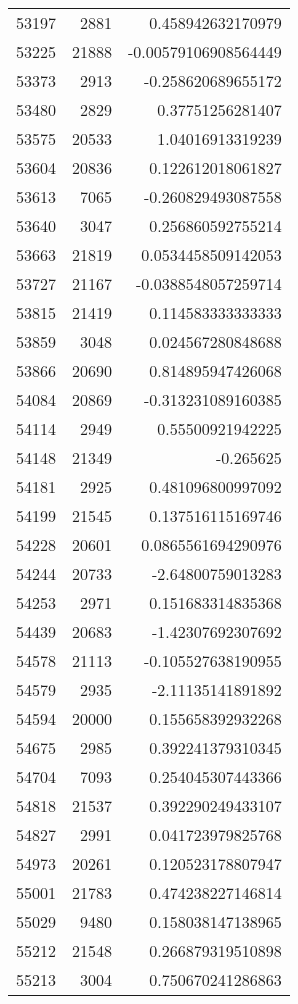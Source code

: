 \begin{tabular}{r | r | r}
53197 & 2881 & 0.458942632170979 \\
53225 & 21888 & -0.00579106908564449 \\
53373 & 2913 & -0.258620689655172 \\
53480 & 2829 & 0.37751256281407 \\
53575 & 20533 & 1.04016913319239 \\
53604 & 20836 & 0.122612018061827 \\
53613 & 7065 & -0.260829493087558 \\
53640 & 3047 & 0.256860592755214 \\
53663 & 21819 & 0.0534458509142053 \\
53727 & 21167 & -0.0388548057259714 \\
53815 & 21419 & 0.114583333333333 \\
53859 & 3048 & 0.024567280848688 \\
53866 & 20690 & 0.814895947426068 \\
54084 & 20869 & -0.313231089160385 \\
54114 & 2949 & 0.55500921942225 \\
54148 & 21349 & -0.265625 \\
54181 & 2925 & 0.481096800997092 \\
54199 & 21545 & 0.137516115169746 \\
54228 & 20601 & 0.0865561694290976 \\
54244 & 20733 & -2.64800759013283 \\
54253 & 2971 & 0.151683314835368 \\
54439 & 20683 & -1.42307692307692 \\
54578 & 21113 & -0.105527638190955 \\
54579 & 2935 & -2.11135141891892 \\
54594 & 20000 & 0.155658392932268 \\
54675 & 2985 & 0.392241379310345 \\
54704 & 7093 & 0.254045307443366 \\
54818 & 21537 & 0.392290249433107 \\
54827 & 2991 & 0.041723979825768 \\
54973 & 20261 & 0.120523178807947 \\
55001 & 21783 & 0.474238227146814 \\
55029 & 9480 & 0.158038147138965 \\
55212 & 21548 & 0.266879319510898 \\
55213 & 3004 & 0.750670241286863 \\

\end{tabular}
